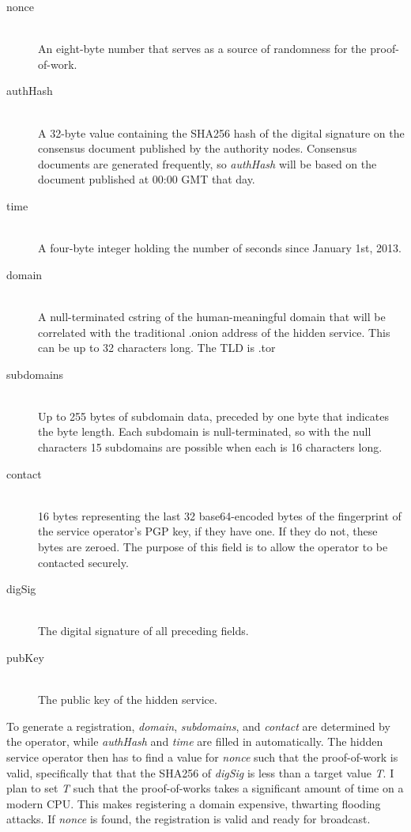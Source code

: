 \documentclass[journal]{IEEEtran}
\begin{document}
\begin{description}
	\item[nonce] \hfill \\
		An eight-byte number that serves as a source of randomness for the proof-of-work.
	\item[authHash] \hfill \\
		A 32-byte value containing the SHA256 hash of the digital signature on the consensus document published by the authority nodes. Consensus documents are generated frequently, so \textit{authHash} will be based on the document published at 00:00 GMT that day.
	\item[time] \hfill \\
		A four-byte integer holding the number of seconds since January 1st, 2013.
	\item[domain] \hfill \\
		A null-terminated cstring of the human-meaningful domain that will be correlated with the traditional .onion address of the hidden service. This can be up to 32 characters long. The TLD is .tor
	\item[subdomains] \hfill \\
		Up to 255 bytes of subdomain data, preceded by one byte that indicates the byte length. Each subdomain is null-terminated, so with the null characters 15 subdomains are possible when each is 16 characters long.
	\item[contact] \hfill \\
		16 bytes representing the last 32 base64-encoded bytes of the fingerprint of the service operator's PGP key, if they have one. If they do not, these bytes are zeroed. The purpose of this field is to allow the operator to be contacted securely.
	\item[digSig] \hfill \\
		The digital signature of all preceding fields.
	\item[pubKey] \hfill \\
		The public key of the hidden service.
\end{description}

To generate a registration, \textit{domain}, \textit{subdomains}, and \textit{contact} are determined by the operator, while \textit{authHash} and \textit{time} are filled in automatically. The hidden service operator then has to find a value for \textit{nonce} such that the proof-of-work is valid, specifically that that the SHA256 of \textit{digSig} is less than a target value \textit{T}. I plan to set \textit{T} such that the proof-of-works takes a significant amount of time on a modern CPU. This makes registering a domain expensive, thwarting flooding attacks. If \textit{nonce} is found, the registration is valid and ready for broadcast.
\end{document}
